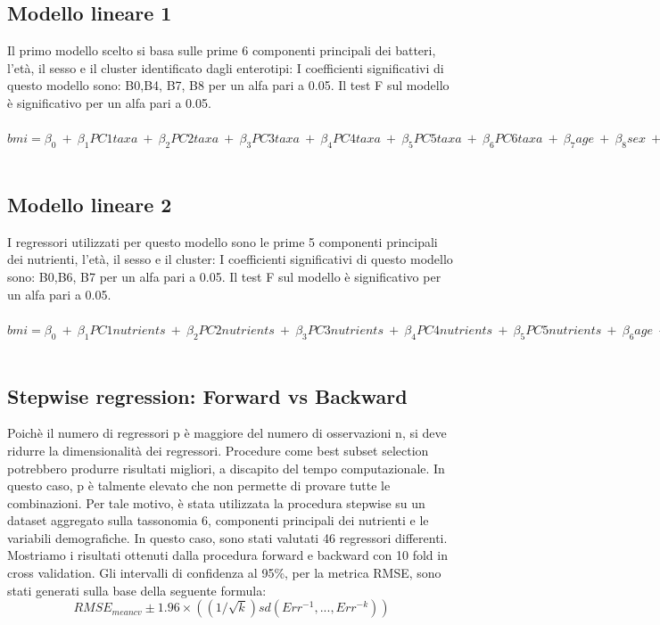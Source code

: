 \subsection{Modello lineare 1} 
Il primo modello scelto si basa sulle prime 6 componenti principali dei batteri, l’età, il sesso e il cluster identificato dagli enterotipi: 
I coefficienti significativi di questo modello sono: B0,B4, B7, B8 per un alfa pari a 0.05. Il test F sul modello è significativo per un alfa pari a 0.05. 
\\
\\
$bmi = \beta_0 \:+\: \beta_1 PC1taxa\: +\: \beta_2 PC2taxa \:+\: \beta_3 PC3taxa\: +\: \beta_4 PC4taxa \: +\: \beta_5 PC5taxa \:+\: \beta_6 PC6taxa\: +\: \beta_7 age\: +\: \beta_8 sex \:+\: \beta_9 cluster\: +\: \epsilon$
\\
\\

\subsection{Modello lineare 2}
I regressori utilizzati per questo modello sono le prime 5 componenti principali dei nutrienti, l’età, il sesso e il cluster: 
I coefficienti significativi di questo modello sono: B0,B6, B7 per un alfa pari a 0.05. Il test F sul modello è significativo per un alfa pari a 0.05. 
\\
\\
$bmi = \beta_0 \:+\: \beta_1 PC1nutrients\: +\: \beta_2 PC2nutrients \:+\: \beta_3 PC3nutrients\: +\: \beta_4 PC4nutrients \: +\: \beta_5 PC5nutrients \: +\: \beta_6 age\: +\: \beta_7 sex \:+\: \beta_8 cluster\: +\: \epsilon$
\\
\\
\subsection{Stepwise regression: Forward vs Backward}
Poichè il numero di regressori p è maggiore del numero di osservazioni n, si deve ridurre la dimensionalità dei regressori. Procedure come best subset selection potrebbero produrre risultati migliori, a discapito del tempo computazionale. In questo caso, p è talmente elevato che non permette di provare tutte le combinazioni. Per tale motivo, è stata utilizzata la procedura stepwise su un dataset aggregato sulla tassonomia 6, componenti principali dei nutrienti e le variabili demografiche. In questo caso, sono stati valutati 46 regressori differenti.  Mostriamo i risultati ottenuti dalla procedura forward e backward con 10 fold in cross validation. Gli intervalli di confidenza al 95\%, per la metrica RMSE, sono stati generati sulla base della seguente formula:
$$RMSE_{meancv} \pm 1.96\times ((1/\sqrt{k})sd(Err^{-1}, ... , Err^{-k}))$$


